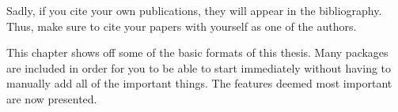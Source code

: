 \begin{jointwork}
    
    Sadly, if you cite your own publications, they will appear in the bibliography. Thus, make sure to cite your papers with yourself as one of the authors.
\end{jointwork}

This chapter shows off some of the basic formats of this thesis. Many packages are included in order for you to be able to start immediately without having to manually add all of the important things. The features deemed most important are now presented.


